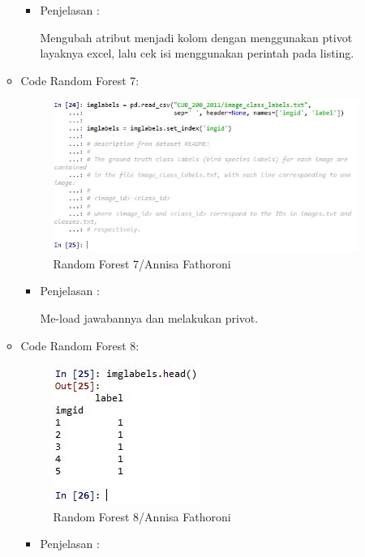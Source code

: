 \begin{enumerate}
\begin{itemize}
\begin{itemize}
\item Penjelasan :

Mengubah atribut menjadi kolom dengan menggunakan ptivot layaknya excel, lalu cek isi menggunakan perintah pada listing.

\end{itemize}
\item Code Random Forest 7:

\begin{figure}[ht]
\centering
\includegraphics[scale=0.6]{figures/Chapter3AnnisaFathoroni16.jpg}
\caption{Random Forest 7/Annisa Fathoroni}
\label{contoh}
\end{figure}

\begin{itemize}
\item Penjelasan :

Me-load jawabannya dan melakukan privot.

\end{itemize}
\item Code Random Forest 8:

\begin{figure}[ht]
\centering
\includegraphics[scale=0.6]{figures/Chapter3AnnisaFathoroni17.jpg}
\caption{Random Forest 8/Annisa Fathoroni}
\label{contoh}
\end{figure}

\begin{itemize}
\item Penjelasan :


\end{itemize}
\end{itemize}
\end{enumerate}
